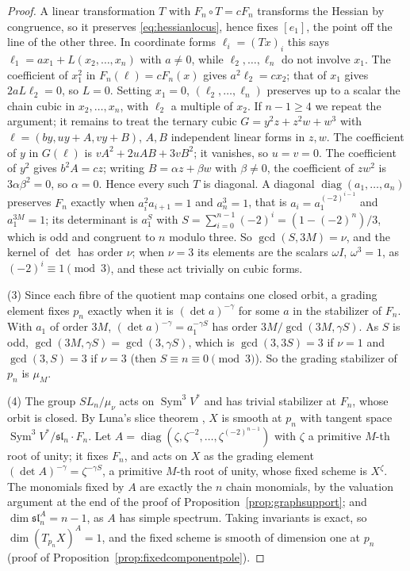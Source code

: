 \documentclass[11pt,a4paper]{article}
\theoremstyle{definition}
\newcommand{\Sym}{\operatorname{Sym}}
\newcommand{\diag}{\operatorname{diag}}
\begin{document}
\begin{proof}
A linear transformation $T$ with $F_n\circ T=cF_n$ transforms the Hessian by
congruence, so it preserves \eqref{eq:hessianlocus}, hence fixes $[e_1]$, the
point off the line of the other three. In coordinate forms $\ell_i=(Tx)_i$
this says $\ell_1=ax_1+L(x_2,\dots,x_n)$ with $a\ne0$, while $\ell_2,\dots,
\ell_n$ do not involve $x_1$. The coefficient of $x_1^2$ in
$F_n(\ell)=cF_n(x)$ gives $a^2\ell_2=cx_2$; that of $x_1$ gives $2aL\ell_2=0$,
so $L=0$. Setting $x_1=0$, $(\ell_2,\dots,\ell_n)$ preserves up to a scalar the
chain cubic in $x_2,\dots,x_n$, with $\ell_2$ a multiple of $x_2$. If $n-1\ge4$
we repeat the argument; it remains to treat the ternary cubic
$G=y^2z+z^2w+w^3$ with $\ell=(by,uy+A,vy+B)$, $A,B$ independent linear forms
in $z,w$. The coefficient of $y$ in $G(\ell)$ is $vA^2+2uAB+3vB^2$; it
vanishes, so $u=v=0$. The coefficient of $y^2$ gives $b^2A=cz$; writing
$B=\alpha z+\beta w$ with $\beta\ne0$, the coefficient of $zw^2$ is
$3\alpha\beta^2=0$, so $\alpha=0$. Hence every such $T$ is diagonal. A
diagonal $\diag(a_1,\dots,a_n)$ preserves $F_n$ exactly when $a_i^2a_{i+1}=1$
and $a_n^3=1$, that is $a_i=a_1^{(-2)^{i-1}}$ and $a_1^{3M}=1$; its
determinant is $a_1^S$ with $S=\sum_{i=0}^{n-1}(-2)^i=(1-(-2)^n)/3$, which is
odd and congruent to $n$ modulo three. So $\gcd(S,3M)=\nu$, and the kernel of
$\det$ has order $\nu$; when $\nu=3$ its elements are the scalars
$\omega I$, $\omega^3=1$, as $(-2)^i\equiv1\pmod3$, and these act trivially on
cubic forms.

(3) Since each fibre of the quotient map contains one closed orbit, a grading
element fixes $p_n$ exactly when it is $(\det a)^{-\gamma}$ for some $a$ in the
stabilizer of $F_n$. With $a_1$ of order $3M$, $(\det a)^{-\gamma}=
a_1^{-\gamma S}$ has order $3M/\gcd(3M,\gamma S)$. As $S$ is odd,
$\gcd(3M,\gamma S)=\gcd(3,\gamma S)$, which is $\gcd(3,3S)=3$ if $\nu=1$ and
$\gcd(3,S)=3$ if $\nu=3$ (then $S\equiv n\equiv0\pmod3$). So the grading
stabilizer of $p_n$ is $\mu_M$.

(4) The group $SL_n/\mu_\nu$ acts on $\Sym^3V^*$ and has trivial stabilizer at
$F_n$, whose orbit is closed. By Luna's slice theorem \cite[Section III.1,
Th\'eor\`eme du slice \'etale and Remarque 1$^\circ$, pp.~97--98]{Luna}, $X$ is smooth at $p_n$ with tangent space
$\Sym^3V^*/\mathfrak{sl}_n\cdot F_n$. Let $A=\diag(\zeta,\zeta^{-2},\dots,
\zeta^{(-2)^{n-1}})$ with $\zeta$ a primitive $M$-th root of unity; it fixes
$F_n$, and acts on $X$ as the grading element $(\det A)^{-\gamma}=\zeta^{-\gamma
S}$, a primitive $M$-th root of unity, whose fixed scheme is $X^\zeta$. The
monomials fixed by $A$ are exactly the $n$ chain monomials, by the valuation
argument at the end of the proof of Proposition~\ref{prop:graphsupport}; and
$\dim\mathfrak{sl}_n^A=n-1$, as $A$ has simple spectrum. Taking invariants is
exact, so $\dim(T_{p_n}X)^A=1$, and the fixed scheme is smooth of dimension one
at $p_n$ (proof of Proposition~\ref{prop:fixedcomponentpole}).
\end{proof}
\end{document}
